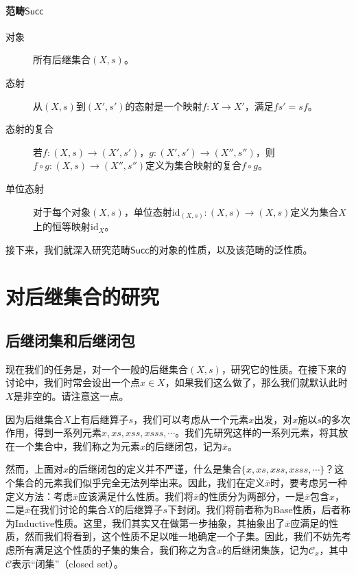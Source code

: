 \documentclass[oneside, 12pt]{ctexart}
\begin{document}
\paragraph{范畴$\mathsf{Succ}$}
\begin{description}
	\item[对象] 所有后继集合$(X, s)$。
	\item[态射] 从$(X, s)$到$(X', s')$的态射是一个映射$f \colon X \to X'$，满足$fs' = sf$。
	\item[态射的复合] 若$f \colon (X, s) \to (X', s')$，$g \colon (X', s') \to (X'', s'')$，则$f \circ g \colon (X, s) \to (X'', s'')$定义为集合映射的复合$f \circ g$。
	\item[单位态射] 对于每个对象$(X, s)$，单位态射$\text{id}_{(X, s)} \colon (X, s) \to (X, s)$定义为集合$X$上的恒等映射$\text{id}_X$。
\end{description}

接下来，我们就深入研究范畴$\mathsf{Succ}$的对象的性质，以及该范畴的泛性质。

\section{对后继集合的研究}

\subsection{后继闭集和后继闭包}

现在我们的任务是，对一个一般的后继集合$(X, s)$，研究它的性质。在接下来的讨论中，我们时常会设出一个点$x \in X$，如果我们这么做了，那么我们就默认此时$X$是非空的。请注意这一点。

因为后继集合$X$上有后继算子$s$，我们可以考虑从一个元素$x$出发，对$x$施以$s$的多次作用，得到一系列元素$x, xs, xss, xsss, \cdots$。我们先研究这样的一系列元素，将其放在一个集合中，我们称之为元素$x$的后继闭包，记为$\overline{x}$。

然而，上面对$x$的后继闭包的定义并不严谨，什么是集合$\{x, xs, xss, xsss, \cdots\}$？这个集合的元素我们似乎完全无法列举出来。因此，我们在定义$\overline{x}$时，要考虑另一种定义方法：考虑$\overline{x}$应该满足什么性质。我们将$\overline{x}$的性质分为两部分，一是$\overline{x}$包含$x$，二是$\overline{x}$在我们讨论的集合$X$的后继算子$s$下封闭。我们将前者称为Base性质，后者称为Inductive性质。这里，我们其实又在做第一步抽象，其抽象出了$\overline{x}$应满足的性质，然而我们将看到，这个性质不足以唯一地确定一个子集。因此，我们不妨先考虑所有满足这个性质的子集的集合，我们称之为含$x$的后继闭集族，记为$\mathcal{C}_x$，其中$\mathcal{C}$表示“闭集”（closed set）。
\end{document}
